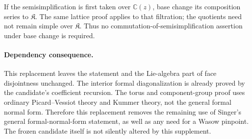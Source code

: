 \documentclass[11pt]{article}
\newcommand{\C}{\mathbb C}
\newcommand{\K}{\mathfrak K}
\begin{document}
If the semisimplification is first taken over $\C(z)$, base change its composition series to $\K$. The same lattice proof applies to that filtration; the quotients need not remain simple over $\K$. Thus no commutation-of-semisimplification assertion under base change is required.

\paragraph{Dependency consequence.}
This replacement leaves the statement and the Lie-algebra part of face disjointness unchanged. The interior formal diagonalization is already proved by the candidate's coefficient recursion. The torus and component-group proof uses ordinary Picard--Vessiot theory and Kummer theory, not the general formal normal form. Therefore this replacement removes the remaining use of Singer's general formal-normal-form statement, as well as any need for a Wasow pinpoint. The frozen candidate itself is not silently altered by this supplement.
\end{document}
